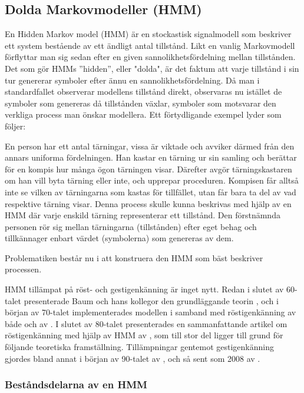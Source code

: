 \documentclass[../rapport_MVEX01-11-05]{subfiles}
\begin{document}
\subsection{Dolda Markovmodeller (HMM)}\label{sec:HMM}

En Hidden Markov model (HMM) är en stockastisk signalmodell som
beskriver ett system bestående av ett ändligt antal tillstånd. Likt en
vanlig Markovmodell förflyttar man sig sedan efter en given
sannolikhetsfördelning mellan tillstånden. Det som gör HMMs ''hidden'',
eller "dolda", är det faktum att varje tillstånd i sin tur genererar
symboler efter ännu en sannolikhetsfördelning. Då man i standardfallet
observerar modellens tillstånd direkt, observaras nu istället de
symboler som genereras då tillstånden växlar, symboler som motsvarar
den verkliga process man önskar modellera. Ett förtydligande exempel
lyder som följer: 

En person har ett antal tärningar, vissa är viktade och avviker därmed
från den annars uniforma fördelningen. Han kastar en tärning ur sin
samling och berättar för en kompis hur många ögon tärningen
visar. Därefter avgör tärningskastaren om han vill byta tärning eller
inte, och upprepar proceduren. Kompisen får alltså inte se vilken av
tärningarna som kastas för tillfället, utan får bara ta del av vad
respektive tärning visar. Denna process skulle kunna beskrivas med
hjälp av en HMM där varje enskild tärning representerar ett
tillstånd. Den förstnämnda personen rör sig mellan tärningarna
(tillstånden) efter eget behag och tillkännager enbart värdet
(symbolerna) som genereras av dem. 

Problematiken består nu i att konstruera den HMM som bäst beskriver
processen.  

HMM tillämpat på röst- och gestigenkänning är inget nytt. Redan i
slutet av 60-talet presenterade Baum och hans kollegor den
grundläggande teorin \cite{Baum66-72}, och i början av 70-talet
implementerades modellen i samband med röstigenkänning av både
 och av . I slutet av
80-talet presenterades en sammanfattande artikel om röstigenkänning
med hjälp av HMM av , som till stor del ligger till
grund för följande teoretiska framställning. Tillämpningar gentemot
gestigenkänning gjordes bland annat i början av 90-talet av ,
och så sent som 2008 av .

\subsubsection{Beståndsdelarna av en HMM}
\end{document}

